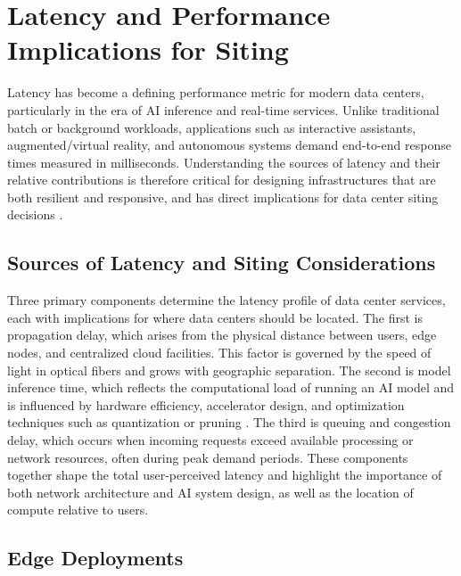 \documentclass[conference]{IEEEtran}
\begin{document}
\section{Latency and Performance Implications for Siting}

Latency has become a defining performance metric for modern data centers, particularly in the era of AI inference and real-time services. Unlike traditional batch or background workloads, applications such as interactive assistants, augmented/virtual reality, and autonomous systems demand end-to-end response times measured in milliseconds. Understanding the sources of latency and their relative contributions is therefore critical for designing infrastructures that are both resilient and responsive, and has direct implications for data center siting decisions \cite{Zakarya2024}.

\subsection{Sources of Latency and Siting Considerations}

Three primary components determine the latency profile of data center services, each with implications for where data centers should be located. The first is propagation delay, which arises from the physical distance between users, edge nodes, and centralized cloud facilities. This factor is governed by the speed of light in optical fibers and grows with geographic separation. The second is model inference time, which reflects the computational load of running an AI model and is influenced by hardware efficiency, accelerator design, and optimization techniques such as quantization or pruning \cite{Zakarya2024}. The third is queuing and congestion delay, which occurs when incoming requests exceed available processing or network resources, often during peak demand periods. These components together shape the total user-perceived latency and highlight the importance of both network architecture and AI system design, as well as the location of compute relative to users.

\subsection{Edge Deployments}
\end{document}

